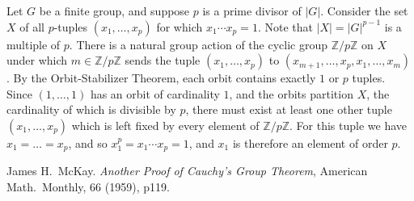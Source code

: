 \documentclass[12pt]{article}
\begin{document}

Let $G$ be a finite group, and suppose $p$ is a prime divisor of $|G|$.
Consider the set $X$ of all $p$-tuples $(x_1, \ldots, x_p)$ 
for which $x_1\cdots x_p = 1$.
Note that $|X| = |G|^{p-1}$ is a multiple of $p$.
There is a natural group action of 
the cyclic group $\mathbb{Z}/p\mathbb{Z}$ on $X$
under which $m \in \mathbb{Z}/p\mathbb{Z}$ sends 
the tuple $(x_1, \ldots, x_p)$ 
to $(x_{m+1}, \ldots, x_p, x_1, \ldots, x_m)$.
By the Orbit-Stabilizer Theorem, each orbit contains exactly $1$ or $p$ tuples.
Since $(1,\ldots, 1)$ has an orbit of cardinality $1$, 
and the orbits partition $X$,
the cardinality of which is divisible by $p$,
there must exist at least one other tuple $(x_1,\ldots, x_p)$
which is left fixed by every element of $\mathbb{Z}/p\mathbb{Z}$.
For this tuple we have $x_1 = \ldots = x_p$,
and so $x_1^p=x_1\cdots x_p=1$,
and $x_1$ is therefore an element of order $p$.

\begin{thebibliography}{9}
 James H.~McKay.
 {\it Another Proof of Cauchy's Group Theorem},
 American Math.~Monthly, 66 (1959), p119.
\end{thebibliography}

\end{document}
